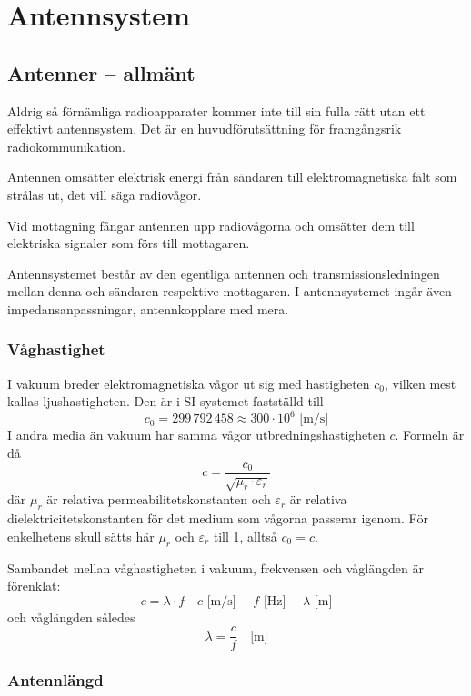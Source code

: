 \chapter{Antennsystem}

\section{Antenner -- allmänt}
\label{antenner_allmänt}

Aldrig så förnämliga radioapparater kommer inte till sin fulla rätt utan ett
effektivt antennsystem.
Det är en huvudförutsättning för framgångsrik radiokommunikation.

Antennen omsätter elektrisk energi från sändaren till elektromagnetiska fält
som strålas ut, det vill säga radiovågor.

Vid mottagning fångar antennen upp radiovågorna och omsätter dem till
elektriska signaler som förs till mottagaren.

Antennsystemet består av den egentliga antennen och transmissionsledningen
mellan denna och sändaren respektive mottagaren.
I antennsystemet ingår även impedansanpassningar, antennkopplare med mera.

\subsection{Våghastighet}
\label{ljushastigheten}

I vakuum breder elektromagnetiska vågor ut sig med hastigheten \(c_0\), vilken
mest kallas ljushastigheten.
Den är i SI-systemet \cite{SIbrochure8} fastställd till
\[c_0 = 299\,792\,458 \approx 300 \cdot 10^6 \text{ [m/s]}\]
I andra media än vakuum har samma vågor utbredningshastigheten \(c\).
Formeln är då
\[c = \frac{c_0}{\sqrt{\mu_r \cdot \varepsilon_r}}\]
där \(\mu_r\) är relativa permeabilitetskonstanten och \(\varepsilon_r\) är
relativa dielektricitetskonstanten för det medium som vågorna passerar igenom.
För enkelhetens skull sätts här \(\mu_r\) och \(\varepsilon_r\) till 1,
alltså \(c_0 = c\).

Sambandet mellan våghastigheten i vakuum, frekvensen och våglängden är förenklat:
\[ c = \lambda \cdot f \quad c\text{ [m/s] }\quad f\text{ [Hz] } \quad \lambda\text{ [m]}\]
och våglängden således
\[ \lambda = \frac{c}{f} \quad \text{[m]} \]

\subsection{Antennlängd}

